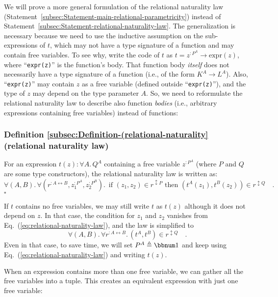 We will prove a more general formulation of the relational naturality
law (Statement~\ref{subsec:Statement-main-relational-parametricity})
instead of Statement~\ref{subsec:Statement-relational-naturality-law}.
The generalization is necessary because we need to use the inductive
assumption on the sub-expressions of $t$, which may not have a type
signature of a function and may contain free variables. To see why,
write the code of $t$ as $t=z^{:P^{A}}\rightarrow\text{expr}(z)$,
 where \textsf{``}\lstinline!expr(z)!\textsf{''} is the function\textsf{'}s body. That function
body \emph{itself} does not necessarily have a type signature of a
function (i.e., of the form $K^{A}\rightarrow L^{A}$). Also, \textsf{``}\lstinline!expr(z)!\textsf{''}
may contain $z$ as a free variable (defined outside \textsf{``}\lstinline!expr(z)!\textsf{''}),
and the type of $z$ may depend on the type parameter $A$. So, we
need to reformulate the relational naturality law to describe also
function \emph{bodies} (i.e., arbitrary expressions containing free
variables) instead of functions:

\subsubsection{Definition \label{subsec:Definition-(relational-naturality}\ref{subsec:Definition-(relational-naturality}
(relational naturality law)}

For an expression $t(z):\forall A.\,Q^{A}$ containing a free variable
$z^{:P^{A}}$ (where $P$ and $Q$ are some type constructors), the
relational naturality law is written as:
\begin{equation}
\forall(A,B).\,\forall(r^{:A\leftrightarrow B},z_{1}^{:P^{A}},z_{2}^{:P^{B}}).\,\text{ if }(z_{1},z_{2})\in r^{\updownarrow P}\text{ then }(t^{A}(z_{1}),t^{B}(z_{2}))\in r^{\updownarrow Q}\quad.\label{eq:relational-naturality-law}
\end{equation}
$\square$

If $t$ contains no free variables, we may still write $t$ as $t(z)$
although it does not depend on $z$. In that case, the condition for
$z_{1}$ and $z_{2}$ vanishes from Eq.~(\ref{eq:relational-naturality-law}),
and the law is simplified to
\[
\forall(A,B).\,\forall r^{:A\leftrightarrow B}.\,(t^{A},t^{B})\in r^{\updownarrow Q}\quad.
\]
Even in that case, to save time, we will set $P^{A}\triangleq\bbnum 1$
and keep using Eq.~(\ref{eq:relational-naturality-law}) and writing
$t(z)$.

When an expression contains more than one free variable, we can gather
all the free variables into a tuple. This creates an equivalent expression
with just one free variable:

